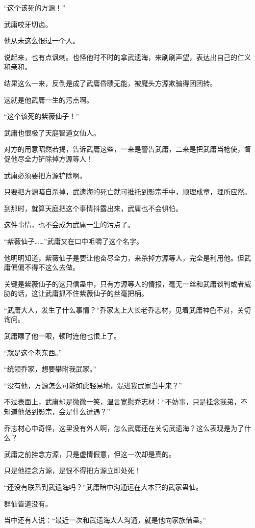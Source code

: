 \begin{this_body}
“这个该死的方源！”

武庸咬牙切齿。

他从未这么恨过一个人。

说起来，也有点讽刺。也怪他时不时的拿武遗海，来刷刷声望，表达出自己的仁义和亲和。

结果这么一来，反倒是成了武庸昏聩无能，被魔头方源欺骗得团团转。

这就是他武庸一生的污点啊。

“这个该死的紫薇仙子！”

武庸也恨极了天庭智道女仙人。

对方的用意昭然若揭，告诉武庸这些，一来是警告武庸，二来是把武庸当枪使，督促他尽全力铲除掉方源等人！

武庸必须要把方源铲除啊。

只要把方源暗自杀掉，武遗海的死亡就可推托到影宗手中，顺理成章，理所应然。

到那时，就算天庭把这个事情抖露出来，武庸也不会惧怕。

这件事情，也不会成为武庸一生的污点了。

“紫薇仙子……”武庸又在口中咀嚼了这个名字。

他明明知道，紫薇仙子是要让他奋尽全力，来杀掉方源等人，完全是利用他。但武庸偏偏不得不这么去做。

关键是紫薇仙子的这只信蛊中，只有方源等人的情报，毫无一丝和武庸谈判或者威胁的话，这让武庸抓不住紫薇仙子的丝毫把柄。

“武庸大人，发生了什么事情？”乔家太上大长老乔志材，见着武庸神色不对，关切询问。

武庸瞟了他一眼，顿时连他也恨上了。

“就是这个老东西。”

“统领乔家，想要攀附我武家。”

“没有他，方源怎么可能如此轻易地，混进我武家当中来？”

不过表面上，武庸却是微微一笑，温言宽慰乔志材：“不妨事，只是挂念我弟，不知道他落到影宗，会是什么遭遇？”

乔志材心中奇怪，这里没有外人啊，怎么武庸还在关切武遗海？这么表现是为了什么？

武庸之前挂念方源，只是虚情假意，但这一次却是真的。

只是他挂念方源，是恨不得把方源立即处死！

“还没有联系到武遗海吗？”武庸暗中沟通远在大本营的武家蛊仙。

群仙皆道没有。

当中还有人说：“最近一次和武遗海大人沟通，就是他向家族借蛊。”


\end{this_body}
